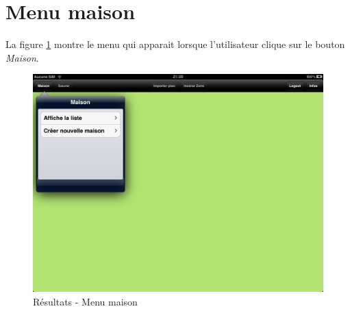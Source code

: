 \clearpage


\section{Menu maison} %
\label{sec:menu_maisons}
La figure \ref{gra:res04} montre le menu qui apparait lorsque l'utilisateur clique sur le bouton \emph{Maison}. 

\begin{figure}[H]
    	\centering
    	\includegraphics[width=\textwidth]{00_media/07_04.PNG}
    	\caption{Résultats - Menu maison}
    	\label{gra:res04}
\end{figure}

\clearpage


